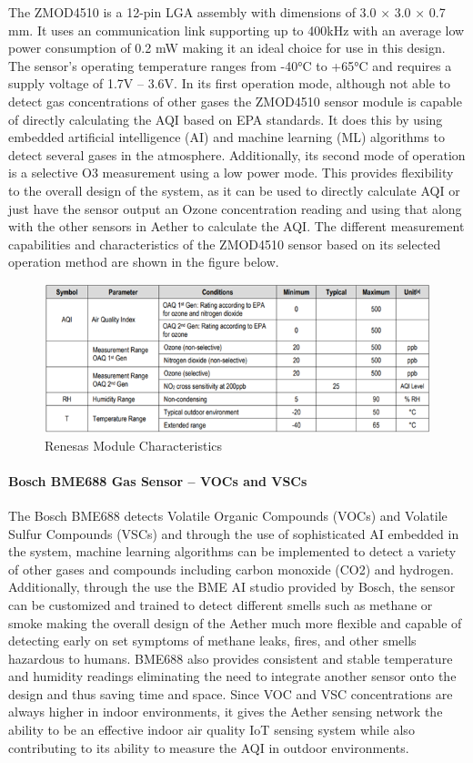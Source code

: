 The ZMOD4510 is a 12-pin LGA assembly with dimensions of 3.0 × 3.0 × 0.7 mm. It uses an \iic communication link supporting up to 400kHz with an average low power consumption of 0.2 mW making it an ideal choice for use in this design. The sensor’s operating temperature ranges from -40°C to +65°C and requires a supply voltage of 1.7V – 3.6V. In its first operation mode, although not able to detect gas concentrations of other gases the ZMOD4510 sensor module is capable of directly calculating the AQI based on EPA standards. It does this by using embedded artificial intelligence (AI) and machine learning (ML) algorithms to detect several gases in the atmosphere. Additionally, its second mode of operation is a selective O3 measurement using a low power mode. This provides flexibility to the overall design of the system, as it can be used to directly calculate AQI or just have the sensor output an Ozone concentration reading and using that along with the other sensors in Aether to calculate the AQI. The different measurement capabilities and characteristics of the ZMOD4510 sensor based on its selected operation method are shown in the figure below. 

\begin{figure}
\centering
\includegraphics[width=6in]{figures/Renesas Sensor Op.png}
\caption{Renesas Module Characteristics}
\label{ZMOD4510 Table}
\end{figure}

\paragraph{Bosch BME688 Gas Sensor – VOCs and VSCs}
The Bosch BME688 detects Volatile Organic Compounds (VOCs) and Volatile Sulfur Compounds (VSCs) and through the use of sophisticated AI embedded in the system, machine learning algorithms can be implemented to detect a variety of other gases and compounds including carbon monoxide (CO2) and hydrogen. Additionally, through the use the BME AI studio provided by Bosch, the sensor can be customized and trained to detect different smells such as methane or smoke making the overall design of the Aether much more flexible and capable of detecting early on set symptoms of methane leaks, fires, and other smells hazardous to humans. BME688 also provides consistent and stable temperature and humidity readings eliminating the need to integrate another sensor onto the design and thus saving time and space. Since VOC and VSC concentrations are always higher in indoor environments, it gives the Aether sensing network the ability to be an effective indoor air quality IoT sensing system while also contributing to its ability to measure the AQI in outdoor environments. 

